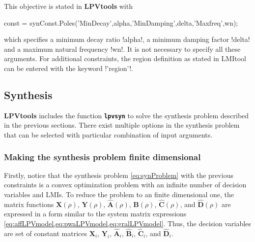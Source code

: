 \documentclass[fleqn,11pt]{article}
\newcommand{\lcode}[1]{\textbf{%
    \lstinline[style=mystyle]{#1}}}
\newcommand{\p}{\rho}
\newcommand{\Xu}{\mathbf{X}}
\newcommand{\Yu}{\mathbf{Y}}
\newcommand{\Au}{\mathbf{\hat A}}
\newcommand{\Bu}{\mathbf{\hat B}}
\newcommand{\Cu}{\mathbf{\hat C}}
\newcommand{\Du}{\mathbf{\hat D}}
\newcommand{\lpvtool}{\textbf{LPVtools}\xspace}
\begin{document}
This objective is stated in \lpvtool with
\begin{code}
const = synConst.Poles('MinDecay',alpha,'MinDamping',delta,'Maxfreq',wn);
\end{code}
which specifies a minimum decay ratio !alpha!, a minimum damping factor !delta! and a maximum natural frequency !wn!. It is not necessary to specify all these arguments. For additional constraints, the region definition as stated in LMItool can be entered with the keyword !'region'!.

\subsection{Synthesis}\label{ssec:Synthesis}

\lpvtool includes the function \lcode{lpvsyn} to solve the synthesis problem described in the previous sections. There exist multiple options in the synthesis problem that can be selected with particular combination of input arguments.

\subsubsection{Making the synthesis problem finite dimensional}\label{sssec:synFinite}

Firstly, notice that the synthesis problem \cref{eq:synProblem} with the previous constraints is a convex optimization problem with an infinite number of decision variables and LMIs. To reduce the problem to an finite dimensional one, the matrix functions $\Xu(\p)$, $\Yu(\p)$, $\Au(\p)$, $\Bu(\p)$, $\Cu(\p)$, and $\Du(\p)$ are expressed in a form similar to the system matrix expressions \cref{eq:affLPVmodel,eq:pwaLPVmodel,eq:gralLPVmodel}. Thus, the decision variables are set of constant matrices $\Xu_i$, $\Yu_i$, $\Au_i$, $\Bu_i$, $\Cu_i$, and $\Du_i$.
\end{document}
